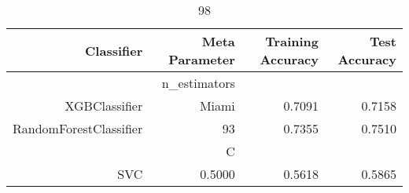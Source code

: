 
\begin{table}[H]
    \caption{98}
    \centering
    \begin{tabular}{|r|r|r|r|}
        \hline
        Classifier &Meta Parameter &Training Accuracy
        &Test Accuracy\\
        \hline
        &n\_estimators &\multicolumn{2}{|r|}{}\\
        \hline
        XGBClassifier &Miami &0.7091 &0.7158\\
        \hline
        RandomForestClassifier &93 &0.7355 &0.7510\\
        \hline
        &C &\multicolumn{2}{|r|}{}\\
        \hline
        SVC &0.5000 &0.5618 &0.5865\\
        \hline
    \end{tabular}
\end{table}
